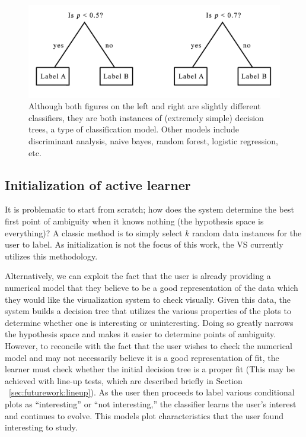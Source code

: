 \begin{figure}[htb]
	\begin{center}
		\includegraphics[width=0.75\linewidth]{ch-visualizer/figures/tree}
		\caption[Classifiers and classification models]{Although both figures 
		on the left and right are slightly different classifiers, they 
		are both instances of (extremely simple) decision trees, a type of 
		classification model. Other models include discriminant analysis, naive 
		bayes, random forest, logistic regression, etc.}
		\label{fig:visualizer:al:tree}
	\end{center}
\end{figure}

\subsection{Initialization of active learner}
\label{sec:visualizer:al:initialization}

It is problematic to start from scratch; how does the system determine
the best first point of ambiguity when it knows nothing (the hypothesis space is
everything)? A classic method is to simply select $k$ random data instances for 
the user to label. As initialization is not the focus of this work, the VS 
currently utilizes this methodology.

Alternatively, we can exploit the fact that the
user is already providing a numerical model that they believe to be a good
representation of the data which they would like the visualization system to
check visually. Given this data, the system builds a decision tree that utilizes
the various properties of the plots to determine whether one is interesting or
uninteresting. Doing so greatly narrows the hypothesis space and makes it easier
to determine points of ambiguity. However, to reconcile with the fact that the
user wishes to check the numerical model and may not necessarily believe it is a
good representation of fit, the learner must check whether the initial decision
tree is a proper fit (This may be achieved with line-up tests, which are 
described briefly in Section ~\ref{sec:futurework:lineup}). As the user then 
proceeds to label various conditional
plots as ``interesting'' or ``not interesting,'' the classifier learns the
user’s interest and continues to evolve. This models plot characteristics that
the user found interesting to study.

